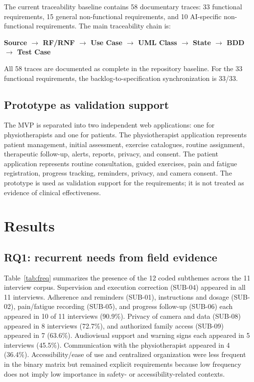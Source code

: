 \documentclass[10pt,a4paper]{article}
\begin{document}
The current traceability baseline contains 58 documentary traces: 33 functional requirements, 15 general non-functional requirements, and 10 AI-specific non-functional requirements. The main traceability chain is:

\begin{center}
\textbf{Source $\rightarrow$ RF/RNF $\rightarrow$ Use Case $\rightarrow$ UML Class $\rightarrow$ State $\rightarrow$ BDD $\rightarrow$ Test Case}
\end{center}

All 58 traces are documented as complete in the repository baseline. For the 33 functional requirements, the backlog-to-specification synchronization is 33/33.

\subsection{Prototype as validation support}
The MVP is separated into two independent web applications: one for physiotherapists and one for patients. The physiotherapist application represents patient management, initial assessment, exercise catalogues, routine assignment, therapeutic follow-up, alerts, reports, privacy, and consent. The patient application represents routine consultation, guided exercises, pain and fatigue registration, progress tracking, reminders, privacy, and camera consent. The prototype is used as validation support for the requirements; it is not treated as evidence of clinical effectiveness.

\section{Results}
\subsection{RQ1: recurrent needs from field evidence}
Table~\ref{tab:freq} summarizes the presence of the 12 coded subthemes across the 11 interview corpus. Supervision and execution correction (SUB-04) appeared in all 11 interviews. Adherence and reminders (SUB-01), instructions and dosage (SUB-02), pain/fatigue recording (SUB-05), and progress follow-up (SUB-06) each appeared in 10 of 11 interviews (90.9\%). Privacy of camera and data (SUB-08) appeared in 8 interviews (72.7\%), and authorized family access (SUB-09) appeared in 7 (63.6\%). Audiovisual support and warning signs each appeared in 5 interviews (45.5\%). Communication with the physiotherapist appeared in 4 (36.4\%). Accessibility/ease of use and centralized organization were less frequent in the binary matrix but remained explicit requirements because low frequency does not imply low importance in safety- or accessibility-related contexts.
\end{document}
